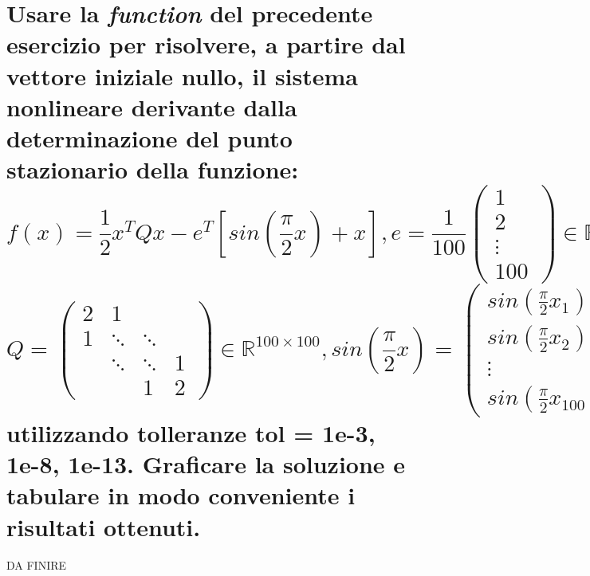 \documentclass[10pt,a4paper]{article}
\begin{document}
\section{Usare la \textit{function} del precedente esercizio per risolvere, a partire
dal vettore iniziale nullo, il sistema nonlineare derivante dalla determinazione
del punto stazionario della funzione:
\[ f(x) = \frac{1}{2}x^TQx-e^T[sin(\frac{\pi}{2}x)+x],
  e = \frac{1}{100}
  \begin{pmatrix}
    1      \\
    2      \\
    \vdots \\
    100
  \end{pmatrix} \in \mathbb{R}^{100},
\]
\[
  Q =
  \begin{pmatrix}
    2 & 1                   \\
    1 & \ddots & \ddots     \\
      & \ddots & \ddots & 1 \\
      &        & 1      & 2
  \end{pmatrix} \in \mathbb{R}^{100 \times 100},
  sin(\frac{\pi}{2}x) =
  \begin{pmatrix}
    sin(\frac{\pi}{2}x_1) \\
    sin(\frac{\pi}{2}x_2) \\
    \vdots                \\
    sin(\frac{\pi}{2}x_{100}).
  \end{pmatrix}
\]
utilizzando tolleranze \textbf{tol = 1e-3, 1e-8, 1e-13.} Graficare la soluzione e tabulare in modo conveniente i risultati ottenuti.
}
DA FINIRE
\end{document}
